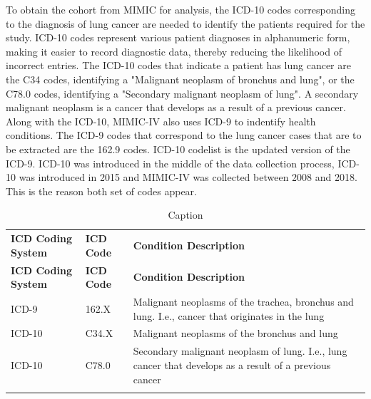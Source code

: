 \documentclass[11pt]{article}
\begin{document}
To obtain the cohort from MIMIC for analysis, the ICD-10 \cite{ICD10}codes corresponding to the diagnosis of lung cancer are needed to identify the patients required for the study. ICD-10 codes represent various patient diagnoses in alphanumeric form, making it easier to record diagnostic data, thereby reducing the likelihood of incorrect entries. The ICD-10 codes that indicate a patient has lung cancer are the C34 codes, identifying a "Malignant neoplasm of bronchus and lung", or the C78.0 codes, identifying a "Secondary malignant neoplasm of lung". A secondary malignant neoplasm is a cancer that develops as a result of a previous cancer. Along with the ICD-10, MIMIC-IV also uses ICD-9 to indentify health conditions. The ICD-9 codes that correspond to the lung cancer cases that are to be extracted are the 162.9 codes. ICD-10 codelist is the updated version of the ICD-9. ICD-10 was introduced in the middle of the data collection process, ICD-10 was introduced in 2015 and MIMIC-IV was collected between 2008 and 2018. This is the reason both set of codes appear.

{\seriffont
{\small
\renewcommand{\arraystretch}{1}
\centering
\begin{center}
\setlength{\arrayrulewidth}{0.7mm}
\begin{longtable}{ | L{2cm} | L{3cm} | L{8cm} | } 
    \hline
    \textbf{ICD Coding System} & \textbf{ICD Code} & \textbf{Condition Description}  \\ 
    \noalign{\global\setlength{\arrayrulewidth}{0.7mm}}
    \hline
    \endfirsthead

\hline
\textbf{ICD Coding System} & \textbf{ICD Code} & \textbf{Condition Description} \\
\hline
\endhead
ICD-9 & 162.X & Malignant neoplasms of the trachea, bronchus and lung. I.e., cancer that originates in the lung  \\ 
    \noalign{\global\setlength{\arrayrulewidth}{0.05mm}}
    \hline
    \noalign{\global\setlength{\arrayrulewidth}{0.7mm}}
ICD-10 & C34.X & Malignant neoplasms of the bronchus and lung  \\ 
    \noalign{\global\setlength{\arrayrulewidth}{0.05mm}}
    \hline
    \noalign{\global\setlength{\arrayrulewidth}{0.7mm}}
ICD-10 & C78.0 & Secondary malignant neoplasm of lung. I.e., lung cancer that develops as a result of a previous cancer  \\ 
    \hline
\caption{Caption}\label{tab:my_label}\\
\end{longtable}
\end{center}}}
\normalsize
\end{document}
